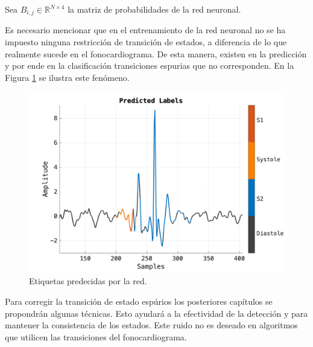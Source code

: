 \indent Sea $B_{i,j} \in \mathbb{R}^{N \times 4}$ la matriz de probabilidades de la red neuronal.


\indent Es necesario mencionar que en el entrenamiento de la red neuronal no se ha impuesto ninguna restricción de
transición de estados, a diferencia de lo que realmente sucede en el fonocardiograma. De esta manera, existen en la
predicción y por ende en la clasificación transiciones espurias que no corresponden. En la Figura
\ref{fig:spurious-transitions} se ilustra este fenómeno.

\begin{figure}[H]
  \centering
  \includegraphics[scale=0.3]{chapters/chapter-07/images/predicted-labels.png}
  \caption[Etiquetas predecidas por la red]{Etiquetas predecidas por la red.}
  \label{fig:spurious-transitions}
\end{figure}

\indent Para corregir la transición de estado espúrios los posteriores capítulos se propondrán algunas técnicas.
Esto ayudará a la efectividad de la detección y para mantener la consistencia de los estados. Este ruido no es
deseado en algoritmos que utilicen las transiciones del fonocardiograma.

